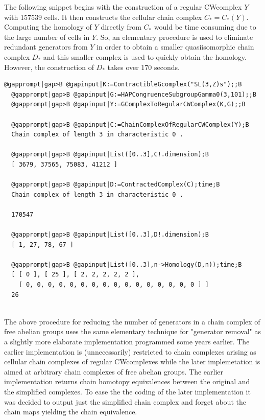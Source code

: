 \documentclass[a4paper,11pt]{report}
\begin{document}
{{ The following snippet begins with the construction of a regular
CW\texttt{}complex $Y$ with 157539 cells. It then constructs the cellular chain complex $C_\ast=C_\ast(Y)$. Computing the homology of $Y$ directly from $C_\ast$ would be time consuming due to the large number of cells in $Y$. So, an elementary procedure is used to eliminate redundant generators from $Y$ in order to obtain a smaller quasi\texttt{}isomorphic chain complex $D_\ast$ and this smaller complex is used to quickly obtain the homology. However, the
construction of $D_\ast$ takes over 170 seconds. 
\begin{Verbatim}[commandchars=@|B,fontsize=\small,frame=single,label=Example]
  @gapprompt|gap>B @gapinput|K:=ContractibleGcomplex("SL(3,Z)s");;B
  @gapprompt|gap>B @gapinput|G:=HAPCongruenceSubgroupGamma0(3,101);;B
  @gapprompt|gap>B @gapinput|Y:=GComplexToRegularCWComplex(K,G);;B
  
  @gapprompt|gap>B @gapinput|C:=ChainComplexOfRegularCWComplex(Y);B
  Chain complex of length 3 in characteristic 0 . 
  
  @gapprompt|gap>B @gapinput|List([0..3],C!.dimension);B
  [ 3679, 37565, 75083, 41212 ]
  
  @gapprompt|gap>B @gapinput|D:=ContractedComplex(C);time;B
  Chain complex of length 3 in characteristic 0 . 
  
  170547
  
  @gapprompt|gap>B @gapinput|List([0..3],D!.dimension);B
  [ 1, 27, 78, 67 ]
  
  @gapprompt|gap>B @gapinput|List([0..3],n->Homology(D,n));time;B
  [ [ 0 ], [ 25 ], [ 2, 2, 2, 2, 2 ], 
    [ 0, 0, 0, 0, 0, 0, 0, 0, 0, 0, 0, 0, 0, 0, 0, 0 ] ]
  26
  
\end{Verbatim}
 

 The above procedure for reducing the number of generators in a chain complex
of free abelian groups uses the same elementary technique for "generator
removal" as a slightly more elaborate implementation programmed some years
earlier. The earlier implementation is (unnecessarily) restricted to chain
complexes arising as cellular chain complexes of regular
CW\texttt{}complexes while the later implemetation is aimed at
arbitrary chain complexes of free abelian groups. The earlier implementation
returns chain homotopy equivalences between the original and the simplified
complexes. To ease the the coding of the later implementation it was decided
to output just the simplified chain complex and forget about the chain maps
yielding the chain equivalence. 

}}
\end{document}
